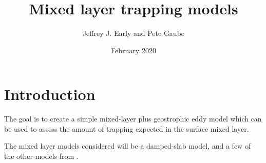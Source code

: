 \documentclass{article}
\title{Mixed layer trapping models}
\author{Jeffrey J. Early and Pete Gaube}
\date{February 2020}
\begin{document}
\maketitle

\section{Introduction}

The goal is to create a simple mixed-layer plus geostrophic eddy model which can be used to assess the amount of trapping expected in the surface mixed layer.

The mixed layer models considered will be a damped-slab model, and a few of the other models from \cite{elipot2009-os}.


\end{document}
